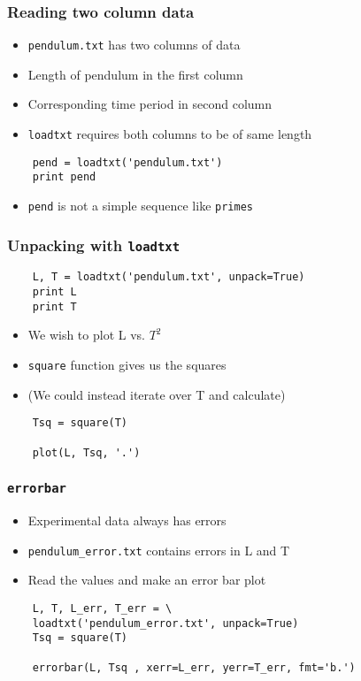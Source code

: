 \begin{frame}[fragile]
  \frametitle{Reading two column data}
  \begin{itemize}
  \item \texttt{pendulum.txt} has two columns of data
  \item Length of pendulum in the first column 
  \item Corresponding time period in second column
  \item \texttt{loadtxt} requires both columns to be of same length
  \end{itemize}
  \begin{lstlisting}
    pend = loadtxt('pendulum.txt')
    print pend
  \end{lstlisting}
  \begin{itemize}
  \item \texttt{pend} is not a simple sequence like \texttt{primes}
  \end{itemize}
\end{frame}

\begin{frame}[fragile]
  \frametitle{Unpacking with \texttt{loadtxt}}
  \begin{lstlisting}
    L, T = loadtxt('pendulum.txt', unpack=True)
    print L
    print T
  \end{lstlisting}
  \begin{itemize}
  \item We wish to plot L vs. $T^2$
  \item \texttt{square} function gives us the squares
  \item (We could instead iterate over T and calculate)
  \end{itemize}
  \begin{lstlisting}
    Tsq = square(T)

    plot(L, Tsq, '.')
  \end{lstlisting}
\end{frame}

\begin{frame}[fragile]
  \frametitle{\texttt{errorbar}}
  \begin{itemize}
  \item Experimental data always has errors
  \item \texttt{pendulum\_error.txt} contains errors in L and T
  \item Read the values and make an error bar plot
  \end{itemize}
  \begin{lstlisting}
    L, T, L_err, T_err = \
    loadtxt('pendulum_error.txt', unpack=True)
    Tsq = square(T)

    errorbar(L, Tsq , xerr=L_err, yerr=T_err, fmt='b.')
  \end{lstlisting}
\end{frame}

